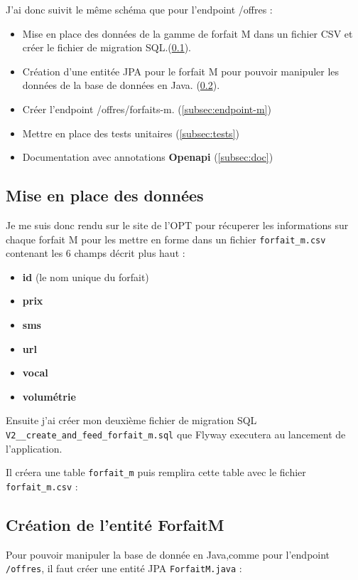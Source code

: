 \documentclass{article}
\begin{document}
	J'ai donc suivit le même schéma que pour l'endpoint /offres :
	\begin{itemize}
	\item Mise en place des données de la gamme de forfait M dans un fichier CSV et créer le fichier de migration SQL.(\ref{subsec:mpd}).
	\item Création d'une entitée JPA pour le forfait M pour pouvoir manipuler les données de la base de données en Java. (\ref{subsec:JPA}). 
	\item Créer l'endpoint /offres/forfaits-m. (\ref{subsec:endpoint-m})
	\item Mettre en place des tests unitaires (\ref{subsec:tests})
	\item Documentation avec annotations \textbf{Openapi} (\ref{subsec:doc})
	\end{itemize}
	
	\subsection{Mise en place des données}
	\label{subsec:mpd}
	Je me suis donc rendu sur le site de l'OPT pour récuperer les informations sur chaque forfait M pour les mettre en forme dans un fichier \texttt{forfait\_m.csv}
	contenant les 6 champs décrit plus haut : 
	\begin{itemize} 
		\item \textbf{id} (le nom unique du forfait)
		\item \textbf{prix}
		\item \textbf{sms}
		\item \textbf{url}
		\item \textbf{vocal}
		\item \textbf{volumétrie}
	\end{itemize}
	
	Ensuite j'ai créer mon deuxième fichier de migration SQL \texttt{V2\_\_create\_and\_feed\_forfait\_m.sql} que Flyway executera au lancement de l'application. 
	
	Il créera une table \texttt{forfait\_m} puis remplira cette table avec le fichier \texttt{forfait\_m.csv} : 
	\subsection{Création de l'entité ForfaitM}
	\label{subsec:JPA}
	Pour pouvoir manipuler la base de donnée en Java,comme pour l'endpoint \texttt{/offres}, il faut créer une entité JPA \texttt{ForfaitM.java} :
	
\end{document}

